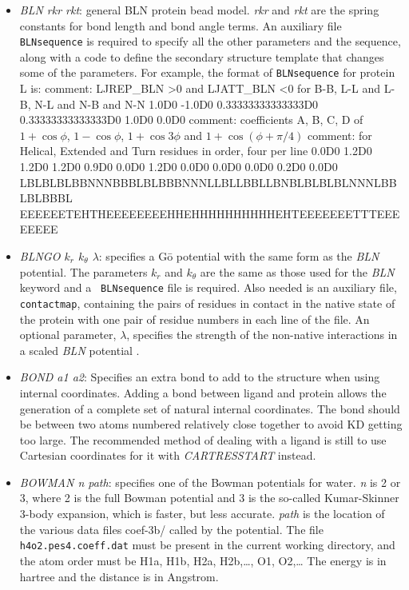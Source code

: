 \documentclass[12pt,a4paper,dvips]{article}
\begin{document}
\begin{itemize}
\item {\it BLN rkr rkt\/}: general BLN protein bead model.\cite{SorensonH00,BrownFH03}
{\it rkr} and {\it rkt} are the spring constants for bond length and bond angle terms.
An auxiliary file {\tt BLNsequence} is required to specify all the other parameters and
the sequence, along with a code to define the secondary structure template that changes
some of the parameters.
For example, the format of {\tt BLNsequence} for protein L is:
{\obeylines
comment: LJREP\_BLN >0  and LJATT\_BLN <0 for B-B, L-L and L-B, N-L and N-B and N-N
1.0D0 -1.0D0
0.33333333333333D0 0.33333333333333D0
1.0D0 0.0D0
comment: coefficients A, B, C, D of $1+\cos\phi$, $1-\cos\phi$, $1+\cos3\phi$ and $1+\cos(\phi +\pi/4)$
comment: for Helical, Extended and Turn residues in order, four per line
0.0D0 1.2D0 1.2D0 1.2D0
0.9D0 0.0D0 1.2D0 0.0D0
0.0D0 0.0D0 0.2D0 0.0D0
LBLBLBLBBNNNBBBLBLBBBNNNLLBLLBBLLBNBLBLBLBLNNNLBBLBLBBBL
EEEEEETEHTHEEEEEEEEHHEHHHHHHHHHHEHTEEEEEEETTTEEEEEEEE
}

\item {\it BLNGO $k_r$ $k_\theta$ $\lambda$}: specifies a G\=o potential
with the same form as the {\it BLN} potential. The parameters $k_r$
and $k_\theta$ are the same as those used for the {\it BLN} keyword and a {\tt
BLNsequence} file is required. Also needed is an auxiliary file, {\tt
contactmap}, containing the pairs of residues in contact in the native state of the protein
with one pair of residue numbers in each line of the file. An optional
parameter, $\lambda$, specifies the strength of the non-native interactions in a
scaled {\it BLN} potential \cite{KimKS09}.

\item {\it BOND a1 a2\/}: Specifies an extra bond to add to the structure when
  using internal coordinates. Adding a bond between ligand and protein allows the generation of a complete set
  of natural
  internal coordinates. The bond should be between two atoms numbered
  relatively close together to avoid KD getting too large. The recommended
  method of dealing with a ligand is still to use Cartesian coordinates for it
  with {\it CARTRESSTART} instead.

\item {\it BOWMAN n path\/}: specifies one of the Bowman potentials for water.
{\it n} is 2 or 3, where 2 is the full Bowman potential and 
3 is the so-called Kumar-Skinner 3-body expansion, which is faster, but less accurate.
{\it path\/} is the location of the various data files coef-3b/\* called by the potential.
The file {\tt h4o2.pes4.coeff.dat} must be present in the current working directory,
and the atom order must be H1a, H1b, H2a, H2b,\ldots, O1, O2,\ldots
The energy is in hartree and the distance is in Angstrom.
 

\end{itemize}
\end{document}
